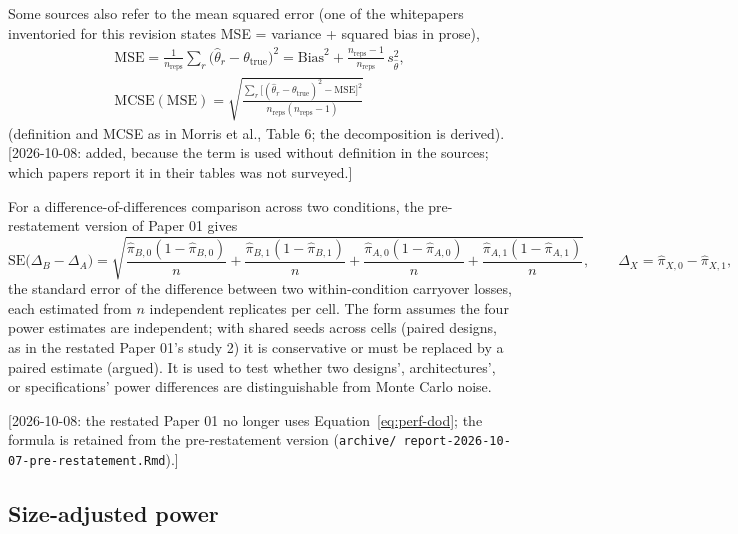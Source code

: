 \documentclass[11pt]{article}
\newcommand{\note}[1]{\textcolor{blue!60!black}{\small [#1]}}
\newcommand{\code}[1]{\texttt{#1}}
\begin{document}
Some sources also refer to the mean squared error (one of the
whitepapers inventoried for this revision states MSE = variance +
squared bias in prose),
\begin{equation}
\begin{gathered}
\mathrm{MSE} = \frac{1}{n_{\mathrm{reps}}}\sum_r
  \big(\hat\theta_r - \theta_{\mathrm{true}}\big)^2
  = \mathrm{Bias}^2 + \frac{n_{\mathrm{reps}} - 1}{n_{\mathrm{reps}}}\,
    s_{\hat\theta}^2, \\
\mathrm{MCSE}(\mathrm{MSE}) = \sqrt{\frac{\sum_r \big[(\hat\theta_r -
  \theta_{\mathrm{true}})^2 - \mathrm{MSE}\big]^2}
  {n_{\mathrm{reps}}(n_{\mathrm{reps}} - 1)}}
\end{gathered}
\label{eq:perf-mse}
\end{equation}
(definition and MCSE as in Morris et al., Table 6; the decomposition is
derived). \note{2026-10-08: added, because the term is used without
definition in the sources; which papers report it in their tables was
not surveyed.}

For a difference-of-differences comparison across two conditions, the
pre-restatement version of Paper 01 gives
\begin{equation}
\mathrm{SE}\big(\Delta_B - \Delta_A\big) = \sqrt{
  \frac{\hat\pi_{B,0}(1-\hat\pi_{B,0})}{n} +
  \frac{\hat\pi_{B,1}(1-\hat\pi_{B,1})}{n} +
  \frac{\hat\pi_{A,0}(1-\hat\pi_{A,0})}{n} +
  \frac{\hat\pi_{A,1}(1-\hat\pi_{A,1})}{n}}, \qquad \Delta_X =
  \hat\pi_{X,0} - \hat\pi_{X,1},
\label{eq:perf-dod}
\end{equation}
the standard error of the difference between two within-condition
carryover losses, each estimated from $n$ independent replicates per
cell. The form assumes the four power estimates are independent; with
shared seeds across cells (paired designs, as in the restated Paper
01's study 2) it is conservative or must be replaced by a paired
estimate (argued). It is used to test whether two designs',
architectures', or specifications' power differences are
distinguishable from Monte Carlo noise.

\note{2026-10-08: the restated Paper 01 no longer uses
Equation~\eqref{eq:perf-dod}; the formula is retained from the
pre-restatement version (\code{archive/\allowbreak
report-2026-10-07-pre-restatement.Rmd}).}


\subsection{Size-adjusted power}
\label{sec:invc-size-adjusted}
\end{document}
